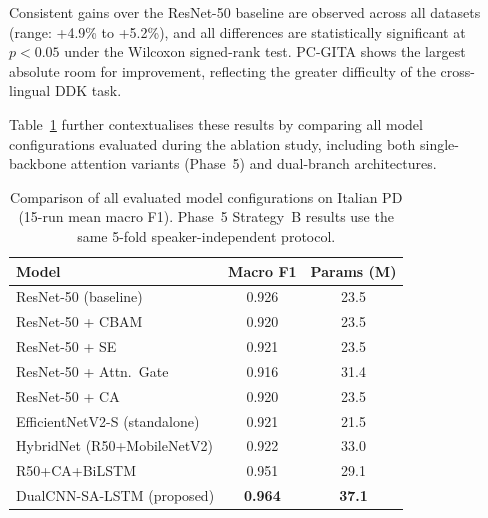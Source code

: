\documentclass[conference]{IEEEtran}
\begin{document}
\begin{table}[t]
  \centering
  \caption{Main results (15-run mean macro F1) across three datasets. $\Delta$\% is the relative gain of the proposed model over the ResNet-50 baseline. All differences are statistically significant ($p<0.05$, Wilcoxon signed-rank test).}
  \label{tab:main}
\end{table}

Consistent gains over the ResNet-50 baseline are observed across all datasets (range: +4.9\% to +5.2\%), and all differences are statistically significant at $p < 0.05$ under the Wilcoxon signed-rank test. PC-GITA shows the largest absolute room for improvement, reflecting the greater difficulty of the cross-lingual DDK task.

Table~\ref{tab:model_comparison} further contextualises these results by comparing all model configurations evaluated during the ablation study, including both single-backbone attention variants (Phase~5) and dual-branch architectures.

\begin{table}[t]
  \centering
  \caption{Comparison of all evaluated model configurations on Italian PD (15-run mean macro F1). Phase~5 Strategy~B results use the same 5-fold speaker-independent protocol.}
  \label{tab:model_comparison}
  \begin{tabular}{lcc}
    \toprule
    \textbf{Model} & \textbf{Macro F1} & \textbf{Params (M)} \\
    \midrule
    ResNet-50 (baseline)              & 0.926 & 23.5 \\
    ResNet-50 + CBAM~\cite{woo2018}   & 0.920 & 23.5 \\
    ResNet-50 + SE~\cite{hu2018}      & 0.921 & 23.5 \\
    ResNet-50 + Attn.~Gate~\cite{schlemper2019} & 0.916 & 31.4 \\
    ResNet-50 + CA~\cite{hou2021}     & 0.920 & 23.5 \\
    EfficientNetV2-S (standalone)     & 0.921 & 21.5 \\
    HybridNet (R50+MobileNetV2)       & 0.922 & 33.0 \\
    R50+CA+BiLSTM                     & 0.951 & 29.1 \\
    DualCNN-SA-LSTM (proposed)        & \textbf{0.964} & \textbf{37.1} \\
    \bottomrule
  \end{tabular}
\end{table}
\end{document}
